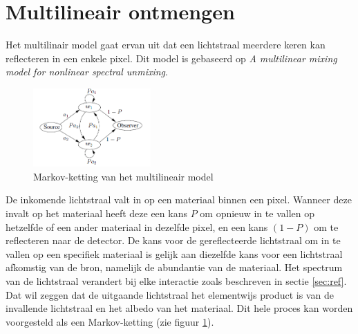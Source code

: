 \documentclass[12pt]{report}
\begin{document}
\section{Multilineair ontmengen} \label{sec:multi}

Het multilinair model gaat ervan uit dat een lichtstraal meerdere keren kan reflecteren in een enkele pixel. Dit model is gebaseerd op \textit{A multilinear mixing model for nonlinear spectral unmixing}\cite{mlinmix}. 

\begin{figure}
\includegraphics[width=0.4\textwidth]{multi.PNG}
\caption{Markov-ketting van het multilineair model \label{fig:multi}}
\end{figure}

De inkomende lichtstraal valt in op een materiaal binnen een pixel. Wanneer deze invalt op het materiaal heeft deze een kans $P$ om opnieuw in te vallen op hetzelfde of een ander materiaal in dezelfde pixel, en een kans $(1 - P)$ om te reflecteren naar de detector. De kans voor de gereflecteerde lichtstraal om in te vallen op een specifiek materiaal is gelijk aan diezelfde kans voor een lichtstraal afkomstig van de bron, namelijk de abundantie van de materiaal. Het spectrum van de lichtstraal verandert bij elke interactie zoals beschreven in sectie \ref{sec:ref}. Dat wil zeggen dat de uitgaande lichtstraal het elementwijs product is van de invallende lichtstraal en het albedo van het materiaal.
Dit hele proces kan worden voorgesteld als een Markov-ketting (zie figuur \ref{fig:multi}).

\end{document}
